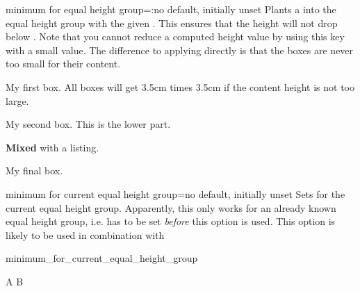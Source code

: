 \clearpage
\begin{docTcbKey}{minimum for equal height group}{=:}{no default, initially unset}
  Plants a  into the equal height group with
  the given . This ensures that the height will not drop below
  . Note that you cannot reduce a computed height value
  by using this key with a small value.
  The difference to applying  directly is that the boxes
  are never too small for their content.

\begin{dispExample}

\begin{tcolorbox}
  My first box. All boxes will get 3.5cm times 3.5cm
  if the content height is not too large.
\end{tcolorbox}%
\begin{tcolorbox}
  My second box.
  \tcblower
  This is the lower part.
\end{tcolorbox}%
\begin{tcblisting}{}
\textbf{Mixed}
with a listing.
\end{tcblisting}
\begin{tcolorbox}[title={Fourth box}]
  My final box.
\end{tcolorbox}%
\end{dispExample}
\end{docTcbKey}


\begin{docTcbKey}[][doc new=2016-03-24]{minimum for current equal height group}{=}{no default, initially unset}
  Sets  for the current equal height
  group. Apparently, this only works for an already known equal height group, i.e.
   has to be set \emph{before} this option is used.
  This option is likely to be used in combination with 

\begin{exdispExample}[runs=2]{minimum_for_current_equal_height_group}
\begin{tcbitemize}[raster equal height,colframe=blue!75!black,colback=white,
  raster every box/.style={minimum for current equal height group=2cm}]
  \tcbitem A
  \tcbitem B
\end{tcbitemize}
\end{exdispExample}

\end{docTcbKey}



